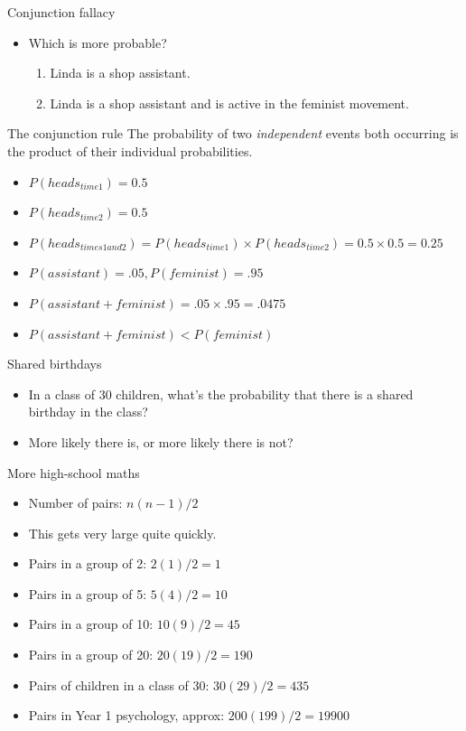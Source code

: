 \documentclass{beamer}
\begin{document}
\begin{frame}{Conjunction fallacy}
\begin{itemize}
\item Which is more probable?
\begin{enumerate}
\item Linda is a shop assistant.
\item Linda is a shop assistant and is active in the feminist movement.
\end{enumerate} 
\end{itemize}
\end{frame}

\begin{frame}{The conjunction rule}
The probability of two \emph{independent} events both occurring is the product of their individual probabilities.
\begin{itemize}
\item $P(heads_{time 1}) = 0.5$
\item $P(heads_{time 2}) = 0.5$
\item $P(heads_{times 1 and 2}) = P(heads_{time 1}) \times P(heads_{time 2}) = 0.5 \times 0.5 = 0.25$
\item $P(assistant) = .05, P(feminist) = .95$
\item $P(assistant + feminist) = .05 \times .95 = .0475$
\item $P(assistant + feminist) < P(feminist)$
\end{itemize}
\end{frame}

\begin{frame}{Shared birthdays}
	\begin{itemize} 
        \item In a class of 30 children, what's the probability that there is a
          shared birthday in the class?
	\item More likely there is, or more likely there is not?
	\end{itemize}
\end{frame}

\begin{frame}{More high-school maths}
\begin{itemize}
\item Number of pairs: $n(n-1)/2$
\item This gets very large quite quickly.
\item Pairs in a group of 2: $2(1)/2 = 1$
\item Pairs in a group of 5: $5(4)/2 = 10$
\item Pairs in a group of 10: $10(9)/2 = 45$
\item Pairs in a group of 20: $20(19)/2 = 190$
\item Pairs of children in a class of 30: $30(29)/2 = 435$
\item Pairs in Year 1 psychology, approx: $200(199)/2 = 19900$
\end{itemize}
\end{frame}
\end{document}
